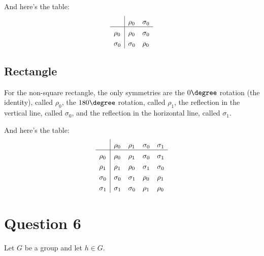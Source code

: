 \documentclass[a4paper]{article}
\begin{document}
And here's the table:
\[
\setlength{\extrarowheight}{3pt}%
\begin{array}{l|*{2}{l}}
    & \rho_0 & \sigma_0 \\
\hline
\rho_0 & \rho_0 & \sigma_0 \\
\sigma_0 & \sigma_0 & \rho_0 \\
\end{array} 
\]

\subsection{Rectangle}

For the non-square rectangle, the only symmetries are the $0\degree$ rotation (the identity), called $\rho_0$, the $180\degree$ rotation, called $\rho_1$, the reflection in the vertical line, called $\sigma_0$, and the reflection in the horizontal line, called $\sigma_1$.

\begin{center}
\end{center}

And here's the table:
\[
\setlength{\extrarowheight}{3pt}%
\begin{array}{l|*{4}{l}}
	& \rho_0 & \rho_1 & \sigma_0 & \sigma_1 \\
\hline
\rho_0 & \rho_0 & \rho_1 & \sigma_0 & \sigma_1 \\
\rho_1 & \rho_1 & \rho_0 & \sigma_1 & \sigma_0 \\
\sigma_0 & \sigma_0 & \sigma_1 & \rho_0 & \rho_1 \\
\sigma_1 & \sigma_1 & \sigma_0 & \rho_1 & \rho_0 \\
\end{array} 
\]

\section*{Question 6}
\setcounter{section}{6}
\setcounter{subsection}{0}

Let $G$ be a group and let $h \in G$.
\end{document}
